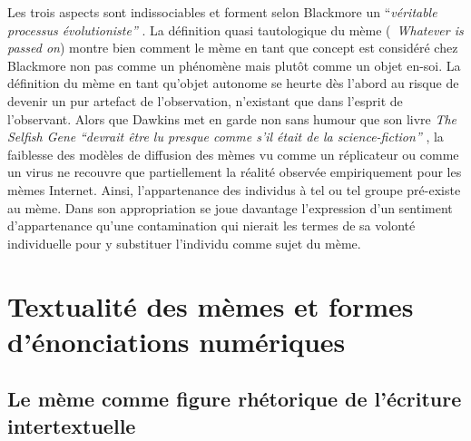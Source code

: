 Les trois aspects sont indissociables et forment selon Blackmore un {\textquotedblleft}\textit{véritable processus évolutioniste{\textquotedblright} }\citep{Blackmore2006}. La définition quasi tautologique du mème ({\guillemotleft}~\textit{Whatever is passed on{\guillemotright}}) montre bien comment le mème en tant que concept est considéré chez Blackmore non pas comme un phénomène mais plutôt comme un objet en-soi. La définition du mème en tant qu{\textquoteright}objet autonome se heurte dès l{\textquoteright}abord au risque de devenir un pur artefact de l{\textquoteright}observation, n{\textquoteright}existant que dans l{\textquoteright}esprit de l{\textquoteright}observant. Alors que Dawkins met en garde non sans humour que son livre \textit{The Selfish Gene} \textit{{\textquotedblleft}devrait être lu presque comme s{\textquoteright}il était de la science-fiction{\textquotedblright} }\citep{Dawkins1989}, la faiblesse des modèles de diffusion des mèmes vu comme un réplicateur ou comme un virus ne recouvre que partiellement la réalité observée empiriquement pour les mèmes Internet. Ainsi, l{\textquoteright}appartenance des individus à tel ou tel groupe pré-existe au mème. Dans son appropriation se joue davantage l{\textquoteright}expression d{\textquoteright}un sentiment d{\textquoteright}appartenance qu{\textquoteright}une contamination qui nierait les termes de sa volonté individuelle pour y substituer l{\textquoteright}individu comme sujet du mème.  


\section[Textualité des mèmes et formes d{\textquoteright}énonciations numériques]{Textualité des mèmes et formes d{\textquoteright}énonciations numériques}

\subsection[Le mème comme figure rhétorique de l{\textquoteright}écriture intertextuelle]{Le mème comme figure rhétorique de l{\textquoteright}écriture intertextuelle}

